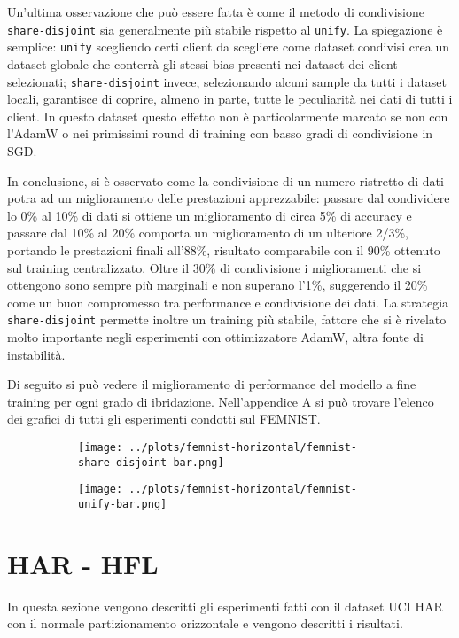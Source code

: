 Un'ultima osservazione che può essere fatta è come il metodo di condivisione
\texttt{share-disjoint} sia generalmente più stabile rispetto al 
\texttt{unify}. La spiegazione è semplice: \texttt{unify} scegliendo 
certi client da scegliere come dataset condivisi crea un dataset 
globale che conterrà gli stessi bias presenti nei dataset dei client 
selezionati; \texttt{share-disjoint} invece, selezionando alcuni sample 
da tutti i dataset locali, garantisce di coprire, almeno in parte, 
tutte le peculiarità nei dati di tutti i client. In questo dataset 
questo effetto non è particolarmente marcato se non con l'AdamW o nei 
primissimi round di training con basso gradi di condivisione in SGD.

In conclusione, si è osservato come la condivisione di un numero ristretto 
di dati potra ad un miglioramento delle prestazioni apprezzabile: passare 
dal condividere lo 0\% al 10\% di dati si ottiene un miglioramento di 
circa 5\% di accuracy e passare dal 10\% al 20\% comporta un miglioramento
di un ulteriore 2/3\%, portando le prestazioni finali all'88\%, 
risultato comparabile con il 90\% ottenuto sul training centralizzato.
Oltre il 30\% di condivisione i miglioramenti che si ottengono sono 
sempre più marginali e non superano l'1\%, suggerendo il 20\% come un 
buon compromesso tra performance e condivisione dei dati.
La strategia \texttt{share-disjoint} permette inoltre un training più
stabile, fattore che si è rivelato molto importante negli esperimenti
con ottimizzatore AdamW, altra fonte di instabilità.

Di seguito si può vedere il miglioramento di performance del modello a 
fine training per ogni grado di ibridazione.
Nell'appendice A si può trovare l'elenco dei grafici di tutti gli 
esperimenti condotti sul FEMNIST.
\begin{figure}[htp]
    \centering
    \begin{subfigure}[b]{0.8\textwidth}
        \centering
        \texttt{[image: ../plots/femnist-horizontal/femnist-share-disjoint-bar.png]}
    \end{subfigure}
    \hfill
    \begin{subfigure}[b]{0.8\textwidth}
        \centering
        \texttt{[image: ../plots/femnist-horizontal/femnist-unify-bar.png]}
    \end{subfigure}
\end{figure}
    

\clearpage
\section{HAR - HFL}
In questa sezione vengono descritti gli esperimenti fatti con il dataset
UCI HAR con il normale partizionamento orizzontale e vengono descritti 
i risultati.

